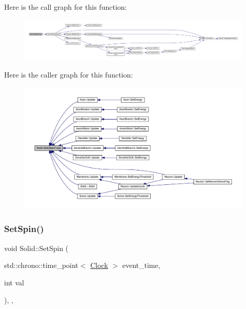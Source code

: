 Here is the call graph for this function\+:
\nopagebreak
\begin{figure}[H]
\begin{center}
\leavevmode
\includegraphics[width=350pt]{class_solid_af6fe46af0be9a9533e114b1c0f186bfc_cgraph}
\end{center}
\end{figure}
Here is the caller graph for this function\+:
\nopagebreak
\begin{figure}[H]
\begin{center}
\leavevmode
\includegraphics[width=350pt]{class_solid_af6fe46af0be9a9533e114b1c0f186bfc_icgraph}
\end{center}
\end{figure}
\mbox{\label{class_solid_a615cb8d1ec1376781726bcefa86339cb}} 
\subsubsection{\texorpdfstring{Set\+Spin()}{SetSpin()}}
{\footnotesize\ttfamily void Solid\+::\+Set\+Spin (\begin{DoxyParamCaption}\item[{std\+::chrono\+::time\+\_\+point$<$ \hyperlink{universe_8h_a0ef8d951d1ca5ab3cfaf7ab4c7a6fd80}{Clock} $>$}]{event\+\_\+time,  }\item[{int}]{val }\end{DoxyParamCaption})\hspace{0.3cm}{\ttfamily [inline]}, {\ttfamily [final]}, {\ttfamily [virtual]}}



